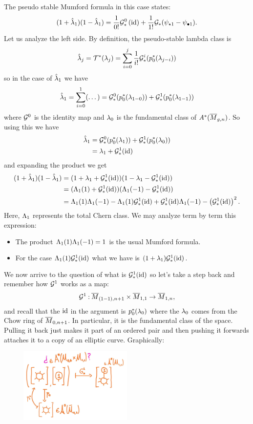 \documentclass[12pt]{memoir}
\begin{document}
\begin{Ex}
    The pseudo stable Mumford formula in this case states:
$$(1+\hat{\lambda}_1)(1-\hat{\lambda}_1)=\frac{1}{0!}\mathcal{G}_\ast^0\left(\operatorname{id}\right)+\frac{1}{1!}\mathcal{G}_\ast(\psi_{\star 1}-\psi_{\bullet 1}).$$
    Let us analyze the left side. By definition, the pseudo-stable lambda class is 
    $$\hat{\lambda}_j=\mathcal{T}^\ast(\lambda_j)=\sum_{i=0}^j\frac{1}{i!}\mathcal{G}_\ast^i(p_0^\ast(\lambda_{j-i}))$$
    so in the case of $\hat{\lambda}_1$ we have 
    $$\hat{\lambda}_1=\sum_{i=0}^1(\dots)=\mathcal{G}_\ast^0(p_0^\ast(\lambda_{1-0}))+\mathcal{G}_\ast^1(p_0^\ast(\lambda_{1-1}))$$
    where $\mathcal{G}^0$ is the identity map and $\lambda_0$ is the fundamental class of $A^\ast(\overline M_{g,n})$. So using this we have 
    \begin{align*}
        \hat{\lambda}_1&=\mathcal{G}_\ast^0(p_0^\ast(\lambda_{1}))+\mathcal{G}_\ast^1(p_0^\ast(\lambda_{0}))\\
        &=\lambda_1+\mathcal{G}_\ast^1(\operatorname{id})
    \end{align*}
    and expanding the product we get 
    \begin{align*}
        (1+\hat{\lambda}_1)(1-\hat{\lambda}_1)&=(1+\lambda_1+\mathcal{G}_\ast^1(\operatorname{id}))(1-\lambda_1-\mathcal{G}_\ast^1(\operatorname{id}))\\
        &=(\Lambda_1(1)+\mathcal{G}_\ast^1(\operatorname{id}))(\Lambda_1(-1)-\mathcal{G}_\ast^1(\operatorname{id}))\\
        &=\Lambda_1(1)\Lambda_1(-1)-\Lambda_1(1)\mathcal{G}_\ast^1(\operatorname{id})+\mathcal{G}_\ast^1(\operatorname{id})\Lambda_1(-1)-\left(\mathcal{G}_\ast^1(\operatorname{id})\right)^2.
    \end{align*}
    Here, $\Lambda_1$ represents the total Chern class. We may analyze term by term this expression:
    \begin{itemize}
        \item The product $\Lambda_1(1)\Lambda_1(-1)=1$ is the usual Mumford formula. 
        \item For the case $\Lambda_1(1)\mathcal{G}_\ast^1(\operatorname{id})$ what we have is $(1+\lambda_1)\mathcal{G}_\ast^1(\operatorname{id})$.
    \end{itemize}
    We now arrive to the question of what is $\mathcal{G}_\ast^1(\operatorname{id})$ so let's take a step back and remember how $\mathcal{G}^1$ works as a map:
    $$\mathcal{G}^1\mathbin{:} \overline M_{(1-1),n+1}\times\overline M_{1,1}\to \overline M_{1,n},$$
    and recall that the $\operatorname{id}$ in the argument is $p_0^\ast(\lambda_0)$ where the $\lambda_0$ comes from the Chow ring of $\overline M_{0,n+1}$. In particular, it is the fundamental class of the space. Pulling it back just makes it part of an ordered pair and then pushing it forwards attaches it to a copy of an elliptic curve. Graphically:
    \begin{figure}[h]
        \centering
        \includegraphics[width=0.5\textwidth, clip]{figs/GluingMapActionEx}

\end{figure}
\end{Ex}
\end{document}
